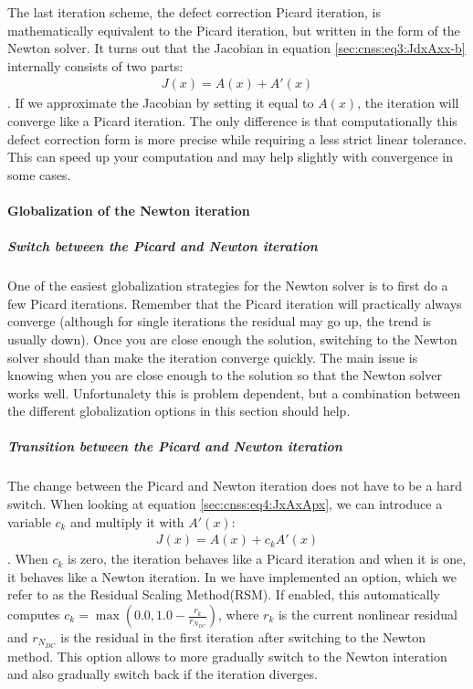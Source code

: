 The last iteration scheme, the defect correction Picard iteration, is mathematically 
equivalent to the Picard iteration, but written in the form of the Newton solver. It 
turns out that the Jacobian in equation \ref{sec:cnss:eq3:JdxAxx-b} internally consists
of two parts: 
\begin{align}
    \label{sec:cnss:eq4:JxAxApx}
    J(x) = A(x) + A'(x) 
\end{align}. If we approximate the Jacobian by setting it 
equal to $A(x)$, the iteration will converge like a Picard iteration. The only difference 
is that computationally this defect correction form is more precise while requiring a less strict
linear tolerance. This can speed up your computation and may help slightly with convergence
in some cases. 

\paragraph{Globalization of the Newton iteration}
\label{sec:cnns:globalization}

\subparagraph{Switch between the Picard and Newton iteration}
One of the easiest globalization strategies for the Newton solver is to first do a few
Picard iterations. Remember that the Picard iteration will practically always converge 
(although for single iterations the residual may go up, the trend is usually down). Once
you are close enough the solution, switching to the Newton solver should than make 
the iteration converge quickly. The main issue is knowing when you are close enough to 
the solution so that the Newton solver works well. Unfortunalety this is problem dependent,
but a combination between the different globalization options in this section should help.

\subparagraph{Transition between the Picard and Newton iteration}
The change between the Picard and Newton iteration does not have to be a hard switch. 
When looking at equation \ref{sec:cnss:eq4:JxAxApx}, we can introduce a variable $c_k$
and multiply it with $A'(x)$:
\begin{align}
    J(x) = A(x) + c_k A'(x) 
\end{align}. When $c_k$ is zero, the iteration behaves like a Picard iteration and when 
it is one, it behaves like a Newton iteration. In \aspect{} we have implemented an option, 
which we refer to as the Residual Scaling Method(RSM). If enabled, this automatically 
computes $c_k = \max\left(0.0,1.0-\frac{r_k}{r_{N_{DC}}}\right)$, where $r_k$ 
is the current nonlinear residual and $r_{N_{DC}}$ is the residual in the first iteration 
after switching to the Newton method. This option allows to more gradually switch to the 
Newton interation and also gradually switch back if the iteration diverges. 

